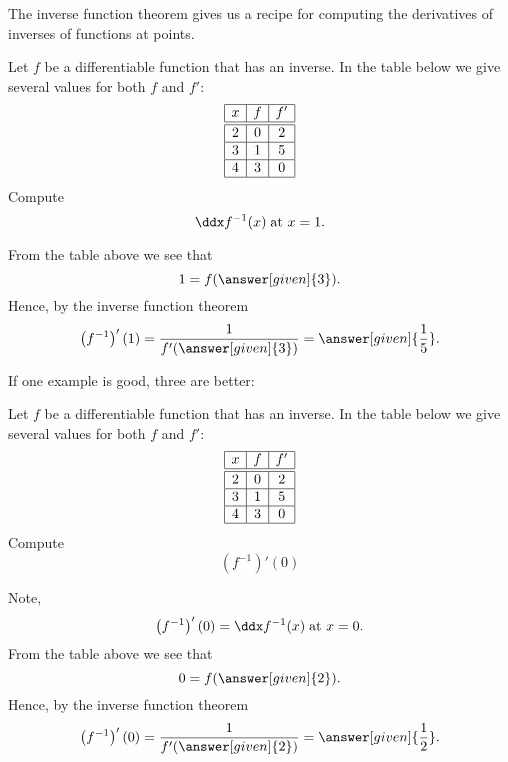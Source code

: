 \documentclass{ximera}
\begin{document}
The inverse function theorem gives us a recipe for computing the
derivatives of inverses of functions at points.

\begin{example}
  Let $f$ be a differentiable function that has an inverse. In the
  table below we give several values for both $f$ and $f'$:
  \[
  \begin{array}{|c|c|c|}\hline
    x & f  & f' \\ \hline \hline
    2 & 0  & 2  \\ \hline
    3 &1  &5 \\ \hline
    4 & 3 & 0  \\ \hline
  \end{array}
  \]
  Compute
  \[
  \ddx f^{-1}(x)\;\text{at $x=1$.}
  \]
  \begin{explanation}
    From the table above we see that
    \[
    1 = f(\answer [given]{3}).
    \]
    Hence, by the inverse function theorem
    \[
    \left(f^{-1}\right)' (1)= \frac{1}{f'(\answer[given]{3})} = \answer[given]{\frac{1}{5}}.
    \]
  \end{explanation}
\end{example}

If one example is good, three are better:

\begin{example}
  Let $f$ be a differentiable function that has an inverse. In the
  table below we give several values for both $f$ and $f'$:
  \[
  \begin{array}{|c|c|c|}\hline
    x & f  & f' \\ \hline \hline
    2 & 0  & 2  \\ \hline
    3 & 1  &5 \\ \hline
    4 & 3 & 0  \\ \hline
  \end{array}
  \]
  Compute
  \[
  \left(f^{-1}\right)'(0)
  \]
  \begin{explanation}
    Note,
    \[
    \left(f^{-1}\right)'(0) = \ddx f^{-1}(x)\;\text{at $x=0$.}
    \]
    From the table above we see that
    \[
    0 = f(\answer[given]{2}).
    \]
    Hence, by the inverse function theorem
    \[
    \left(f^{-1}\right)'(0) = \frac{1}{f'(\answer[given]{2})} = \answer[given]{\frac{1}{2}}.
    \]
  \end{explanation}
\end{example}
\end{document}
